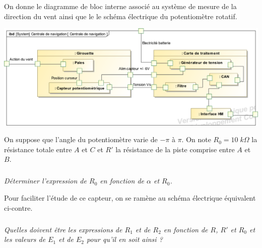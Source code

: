 \documentclass[10pt]{article}
\newif\ifprof
\begin{document}
\vspace{.25cm}

On donne le diagramme de bloc interne associé au système de mesure de la direction du vent ainsi que le le schéma électrique du potentiomètre rotatif. 

\vspace{.25cm}

\begin{minipage}[c]{.55\linewidth}
\begin{center}
\includegraphics[width=\textwidth]{images/ibd}
\end{center}
\end{minipage}\hfill
\begin{minipage}[c]{.3\linewidth}
\begin{center}
\end{center}
\end{minipage} 

\vspace{.25cm}

On suppose que l'angle du potentiomètre varie de $-\pi$ à $\pi$. On note $R_0= 10 \; k\Omega$ la résistance totale entre $A$ et $C$ et $R'$ la résistance de la piste comprise entre $A$ et $B$. 

\subparagraph{}
\textit{Déterminer l'expression de $R_0$ en fonction de $\alpha$ et $R_0$. }
 
\ifprof
\begin{corrige}
\end{corrige}
\else
\fi

Pour faciliter l'étude de ce capteur, on se ramène au schéma électrique équivalent ci-contre.

\subparagraph{}
\textit{Quelles doivent être les expressions de $R_1$ et de $R_2$ en fonction de $R$, $R'$ et $R_0$ et les valeurs de $E_1$ et de $E_2$ pour qu'il en soit ainsi ?}
\ifprof
\begin{corrige}
\end{corrige}
\else
\fi
\end{document}
